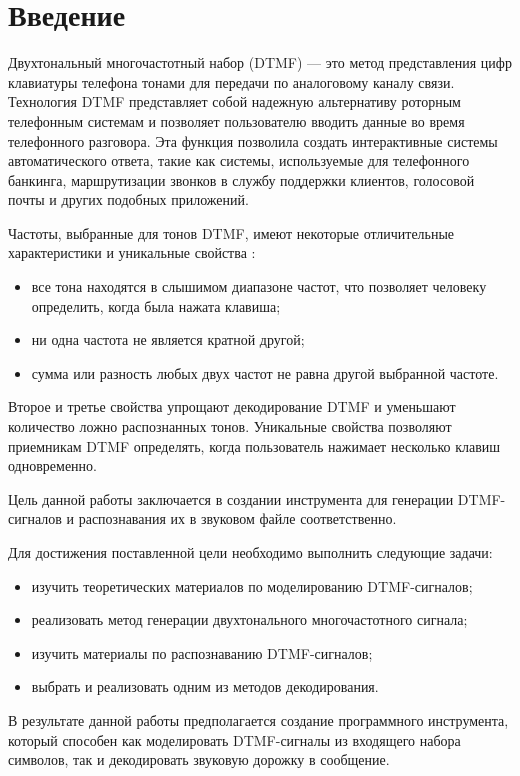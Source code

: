 \chapter*{Введение} %

Двухтональный многочастотный набор (DTMF) — это метод представления цифр клавиатуры телефона тонами для передачи по аналоговому каналу связи. Технология DTMF представляет собой надежную альтернативу роторным телефонным системам и позволяет пользователю вводить данные во время телефонного разговора. Эта функция позволила создать интерактивные системы автоматического ответа, такие как системы, используемые для телефонного банкинга, маршрутизации звонков в службу поддержки клиентов, голосовой почты и других подобных приложений.

Частоты, выбранные для тонов DTMF, имеют некоторые отличительные характеристики и уникальные свойства \cite{dtmf}:

\begin{itemize}
	\item все тона находятся в слышимом диапазоне частот, что позволяет человеку определить, когда была нажата клавиша;
	\item ни одна частота не является кратной другой;
	\item сумма или разность любых двух частот не равна другой выбранной частоте.
\end{itemize} 

Второе и третье свойства упрощают декодирование DTMF и уменьшают количество ложно распознанных тонов. Уникальные свойства позволяют приемникам DTMF определять, когда пользователь нажимает несколько клавиш одновременно.

Цель данной работы заключается в создании инструмента для генерации DTMF-сигналов и распознавания их в звуковом файле соответственно.

Для достижения поставленной цели необходимо выполнить следующие задачи:

\begin{itemize}
	\item изучить теоретических материалов по моделированию DTMF-сигналов;
	\item реализовать метод генерации двухтонального многочастотного сигнала;
	\item изучить материалы по распознаванию DTMF-сигналов;
	\item выбрать и реализовать одним из методов декодирования.
\end{itemize} 

В результате данной работы предполагается создание программного инструмента, который способен как моделировать DTMF-сигналы из входящего набора символов, так и декодировать звуковую дорожку в сообщение. 

\newpage %
